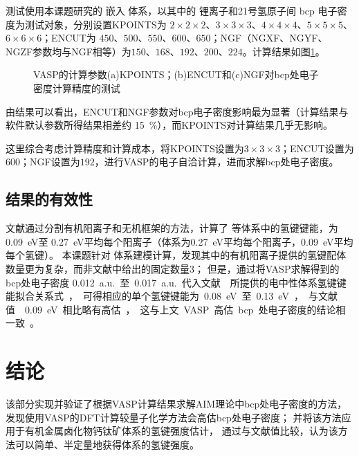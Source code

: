测试使用本课题研究的 嵌入 体系，以其中的 锂离子和21号氢原子间 bcp 电子密度为测试对象，分别设置KPOINTS为 $2 \times 2 \times 2$、$3 \times 3 \times 3$、$4 \times 4 \times 4$、$5 \times 5 \times 5$、$6 \times 6 \times 6$；ENCUT为 $450$、$500$、$550$、$600$、$650$；NGF（NGXF、NGYF、NGZF参数均与NGF相等）为$150$、$168$、$192$、$200$、$224$。计算结果如图\ref{fig:bcp-test2}。

\begin{figure}[htbp]
    \centering
    \caption{VASP的计算参数(a)KPOINTS；(b)ENCUT和(c)NGF对bcp处电子密度计算精度的测试}
    \label{fig:bcp-test2}
\end{figure}


由结果可以看出，ENCUT和NGF参数对bcp电子密度影响最为显著（计算结果与软件默认参数所得结果相差约 \SI{15}{\percent}），而KPOINTS对计算结果几乎无影响。

这里综合考虑计算精度和计算成本，将KPOINTS设置为$3 \times 3 \times 3$；ENCUT设置为$600$；NGF设置为$192$，进行VASP的电子自洽计算，进而求解bcp处电子密度。

\subsection{结果的有效性}

文献\cite{svaneHowStrongHydrogen2017}通过分割有机阳离子和无机框架的方法，计算了  等体系中的氢键键能，为 \SI{0.09}{eV}至 \SI{0.27}{eV}平均每个阳离子（体系为\SI{0.27}{eV}平均每个阳离子，\SI{0.09}{eV}平均每个氢键）。
本课题针对  体系建模计算，发现其中的有机阳离子提供的氢键配体数量更为复杂，而非文献\cite{svaneHowStrongHydrogen2017}中给出的固定数量3；
但是，通过将VASP求解得到的 bcp处电子密度 \SI{0.012}{a.u.} 至 \SI{0.017}{a.u.}代入文献\cite{emamianExploringNaturePredicting2019}所提供的电中性体系氢键键能拟合关系式，可得相应的单个氢键键能为\SI{0.08}{eV}至 \SI{0.13}{eV}，与文献值\cite{svaneHowStrongHydrogen2017}\SI{0.09}{eV}相比略有高估，这与上文 VASP 高估 bcp 处电子密度的结论相一致。

\section{结论}

该部分实现并验证了根据VASP计算结果求解AIM理论中bcp处电子密度的方法，
发现使用VASP的DFT计算较量子化学方法会高估bcp处电子密度；
并将该方法应用于有机金属卤化物钙钛矿体系的氢键强度估计，
通过与文献值比较，认为该方法可以简单、半定量地获得体系的氢键强度。
